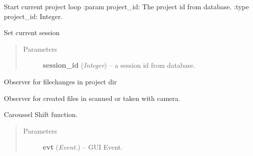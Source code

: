 \documentclass[letterpaper,10pt,english]{sphinxmanual}
\begin{document}
\begin{fulllineitems}
\begin{fulllineitems}
\end{fulllineitems}


\begin{fulllineitems}
\label{api:wos.GUI.SetCurrentProject}
Start current project loop
:param project\_id: The project id from database.
:type project\_id: Integer.

\end{fulllineitems}


\begin{fulllineitems}
\label{api:wos.GUI.SetCurrentSession}
Set current session
\begin{quote}\begin{description}
\item[{Parameters}] \leavevmode
\textbf{session\_id} (\emph{Integer}) -- a session id from database.

\end{description}\end{quote}

\end{fulllineitems}


\begin{fulllineitems}
\label{api:wos.GUI.SetProjectObserver}
Observer for filechanges in project dir

\end{fulllineitems}


\begin{fulllineitems}
\label{api:wos.GUI.SetScanObserver}
Observer for created files in scanned or taken with camera.

\end{fulllineitems}


\begin{fulllineitems}
\label{api:wos.GUI.Shift}
Caroussel Shift function.
\begin{quote}\begin{description}
\item[{Parameters}] \leavevmode
\textbf{evt} (\emph{Event.}) -- GUI Event.


\end{description}
\end{quote}
\end{fulllineitems}
\end{fulllineitems}
\end{document}
